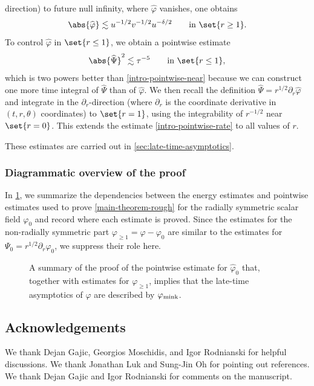 \documentclass[10pt, reqno]{amsart}
\begin{document}
direction) to future null infinity, where \(\widehat{\varphi{}}\) vanishes, one
obtains
\begin{equation}\label{intro-pointwise-rate}
\abs{\widehat{\varphi{}}}\lesssim u^{-1/2}v^{-1/2}u^{-\delta{}/2}\qquad \textnormal{in }\set{r\ge 1}.
\end{equation}
To control \(\widehat{\varphi{}}\) in \(\set{r\le 1}\), we obtain a pointwise estimate
\begin{equation}
\abs{\widehat{\Psi{}}}^2\lesssim \tau^{-5}\qquad \textnormal{in }\set{r\le 1},
\end{equation}
which is two powers better than \cref{intro-pointwise-near} because we can
construct one more time integral of \(\widehat{\Psi{}}\) than of
\(\widehat{\varphi{}}\). We then recall the definition \(\widehat{\Psi{}} =
r^{1/2}\partial_r\widehat{\varphi{}}\) and integrate in the
\(\partial_r\)-direction (where \(\partial{}_{r}\) is the coordinate derivative
in \((t,r,\theta{})\) coordinates) to \(\set{r=1}\), using the integrability of
\(r^{-1/2}\) near \(\set{r=0}\). This extends the estimate
\cref{intro-pointwise-rate} to all values of \(r\).

These estimates are carried out in \cref{sec:late-time-asymptotics}.
\subsubsection{Diagrammatic overview of the proof}
In \cref{flowchart}, we summarize the dependencies between the energy estimates and
pointwise estimates used to prove \cref{main-theorem-rough} for the radially
symmetric scalar field \(\varphi_0\) and record where each estimate is proved.
Since the estimates for the non-radially symmetric part \(\varphi_{\ge 1} =
\varphi{} - \varphi_0\) are similar to the estimates for \(\Psi_0 =
r^{1/2}\partial_r\varphi_0\), we suppress their role here.
\begin{figure}[!htb]
    \centering
    
    \caption{A summary of the proof of the pointwise estimate for \(\widehat{\varphi{}}_0\) that, together with estimates for \(\varphi_{\ge 1}\), implies that the late-time asymptotics of \(\varphi{}\) are described
by \(\varphi_{\textnormal{mink}}\).}
    \label{flowchart}
\end{figure}
\subsection*{Acknowledgements}
We thank Dejan Gajic, Georgios Moschidis, and Igor Rodnianski for helpful
discussions. We thank Jonathan Luk and Sung-Jin Oh for pointing out references.
We thank Dejan Gajic and Igor Rodnianski for comments on the manuscript.
\end{document}
